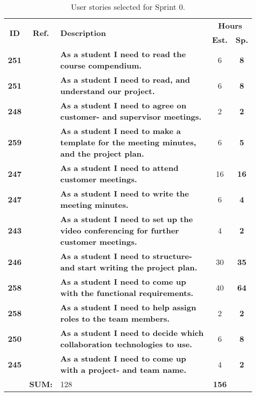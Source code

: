 \begin{table*}[!ht]
\caption{User stories selected for Sprint 0. }
\label{tab:sprint0stories}
\def\arraystretch{1.25}
\begin{tabularx}{\textwidth}{ccXcc} 
\toprule[1mm]

\multirow{2}{*}{\textbf{ID}} &
\multirow{2}{*}{\textbf{Ref.}} & \multirow{2}{*}{\textbf{Description}} & \multicolumn{2}{c}{\textbf{Hours}} \\
 					& & & \textbf{Est.} & \textbf{Sp.} \\

\midrule
\textbf{251} 	&
	& \textbf{As a student I need to read the course compendium.} 										& 		6	& \textbf{8} \\

\textbf{251} 	&
	& \textbf{As a student I need to read, and understand our project.} 								& 		6	& \textbf{8} \\	


\textbf{248} 	&
	& \textbf{As a student I need to agree on customer- and supervisor meetings.} 						& 		2	& \textbf{2} \\


\textbf{259} 	& 
	& {\bf As a student I need to make a template for the meeting minutes, and the project plan.} 		& 		6	& \textbf{5} \\

\textbf{247} 	&
	& \textbf{As a student I need to attend customer meetings.} 										&  		16	& \textbf{16} \\

\textbf{247} 	&
	& \textbf{As a student I need to write the meeting minutes.} 										&  		6	& \textbf{4} \\

\textbf{243} 	&
	& \textbf{As a student I need to set up the video conferencing for further customer meetings.} 		& 		4	& \textbf{2} \\

\textbf{246} 	&
	& \textbf{As a student I need to structure- and start writing the project plan.} 					&  		30	& \textbf{35} \\

\textbf{258} 	&
	& \textbf{As a student I need to come up with the functional requirements.} 						&  		40	& \textbf{64} \\

\textbf{258} 	&
	& \textbf{As a student I need to help assign roles to the team members.} 							& 		2	& \textbf{2} \\

\textbf{250} 	&
	& \textbf{As a student I need to decide which collaboration technologies to use.} 					& 		6	& \textbf{8} \\
\textbf{245} 	& 
	& \textbf{As a student I need to come up with a project- and team name.} 							& 		4	& \textbf{2} \\
\midrule
				& \textbf{SUM:}		&		128	& \textbf{156}
 \\																			
\bottomrule[1mm]
\end{tabularx}
\end{table*}